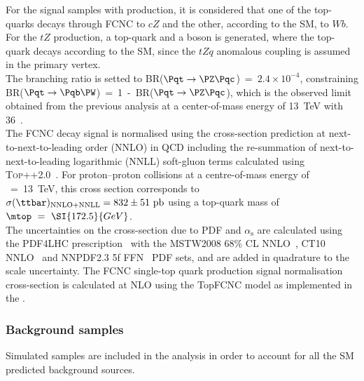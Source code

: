 \noindent For the signal samples with \ttbar production, it is considered that one of the top-quarks decays through FCNC to $cZ$ and the other, according to the SM, to $Wb$.\\ 
For the $tZ$ production, a top-quark and a \PZ boson is generated, where the top-quark decays according to the SM, since the $tZq$ anomalous coupling is assumed in the primary vertex. \\
The branching ratio is setted to \mbox{BR($\mathrm{\Pqt\rightarrow\PZ\Pqc}$) = $2.4\times10^{-4}$}, constraining\\ \mbox{BR($\Pqt\rightarrow \Pqb \PW$) = 1 - BR($\mathrm{\Pqt\rightarrow\PZ\Pqc}$)}, which is the observed limit obtained from
the previous analysis at a center-of-mass energy of \SI{13}{\TeV} with \SI{36}{\ifb}~\cite{TOPQ-2017-06}. \\ 
The FCNC \ttbar decay signal
is normalised using the \ttbar cross-section prediction at next-to-next-to-leading order (NNLO)
in QCD including the re-summation of next-to-next-to-leading logarithmic (NNLL) soft-gluon terms calculated using
\textsc{Top++2.0}~\cite{Beneke:2011mq,Cacciari:2011hy,Baernreuther:2012ws,Czakon:2012zr,Czakon:2012pz,Czakon:2013goa,Czakon:2011xx}.
For proton--proton collisions at a centre-of-mass energy of \rts~=~\SI{13}{\TeV}, this cross section corresponds to
$\sigma(\ttbar)_{\textrm{NNLO+NNLL}} = \mathrm{832\pm51~pb}$ using a top-quark mass of $\mtop~ =~\SI{172.5}{GeV}$.\\
The uncertainties on the cross-section due to PDF and $\alpha_{\textrm{s}}$ are calculated using the PDF4LHC prescription~\cite{Botje:2011sn}
with the MSTW2008 68\% CL NNLO~\cite{Martin:2009iq,Martin:2009bu}, CT10 NNLO~\cite{Lai:2010vv,Gao:2013xoa} and \textsc{NNPDF2.3} 5f FFN~\cite{Ball:2012cx} PDF sets,
and are added in quadrature to the scale uncertainty.
The FCNC single-top quark production signal normalisation cross-section is calculated at 
NLO using the TopFCNC model as implemented in the \aMCatNLO.  \\

\subsubsection{Background samples}
\label{sec:samples:mc:bkg}

Simulated samples are included in the analysis in order to account for all the SM predicted background sources. 


